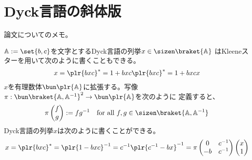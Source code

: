 {\section{Dyck言語の斜体版}\label{s1:Dyck言語の斜体版} %
	論文\cite{gelfand:1997}についてのメモ。

	$\setA:=\set{b,c}$を文字とするDyck言語の列挙$x\in\sizen\braket{\setA}$
	はKleeneスターを用いて次のように書くこともできる。
	\begin{equation*}\begin{split}
		x = \plr{bxc}^* = 1 + bxc\plr{bxc}^* = 1 + bxcx
	\end{split}\end{equation*}
	$x$を有理数体$\bun\plr{\setA}$に拡張する。写像
	$\pi:\bun\braket{\setA,\setA^{-1}}^2\to\bun\plr{\setA}$を次のように
	定義すると、
	\begin{equation*}\begin{split}
		\pi\pvec{f}{g} := fg^{-1}
		\quad\text{for all } f,g\in\sizen\braket{\setA,\setA^{-1}}
	\end{split}\end{equation*}
	Dyck言語の列挙$x$は次のように書くことができる。
	\begin{equation*}\begin{split}
		x = \plr{bxc}^* = \plr{1 - bxc}^{-1} = c^{-1}\plr{c^{-1} - bx}^{-1}
		= \pi \begin{pmatrix}
			0 & c^{-1} \\ -b & c^{-1}
		\end{pmatrix}\pvec{x}{1}
	\end{split}\end{equation*}

}
